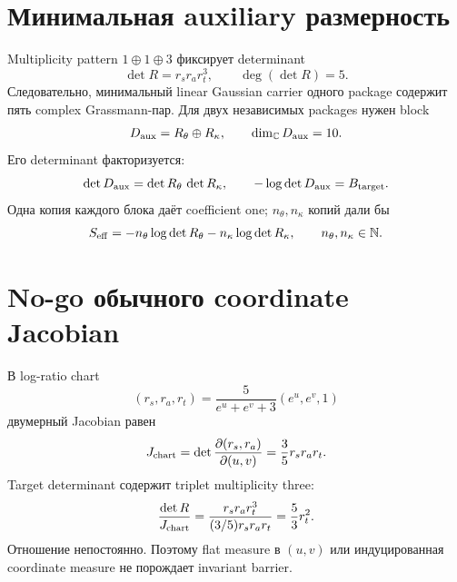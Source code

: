 \section{Минимальная auxiliary размерность}

Multiplicity pattern $1\oplus1\oplus3$ фиксирует determinant
\begin{equation}
 \det R=r_s r_a r_t^3,
 \qquad
 \deg(\det R)=5.
 \label{eq:v9-kms-logdet-measure-degree-five}
\end{equation}
Следовательно, минимальный linear Gaussian carrier одного package содержит
пять complex Grassmann-пар. Для двух независимых packages нужен block
\begin{equation}
 D_{\rm aux}=R_\theta\oplus R_\kappa,
 \qquad
 \dim_{\mathbb C}D_{\rm aux}=10.
 \label{eq:v9-kms-logdet-measure-aux-block}
\end{equation}
Его determinant факторизуется:
\begin{equation}
 \det D_{\rm aux}=\det R_\theta\,\det R_\kappa,
 \qquad
 -\log\det D_{\rm aux}=B_{\rm target}.
 \label{eq:v9-kms-logdet-measure-block-factorization}
\end{equation}
Одна копия каждого блока даёт coefficient one; $n_\theta,n_\kappa$
копий дали бы
\begin{equation}
 S_{\rm eff}=-n_\theta\log\det R_\theta
 -n_\kappa\log\det R_\kappa,
 \qquad n_\theta,n_\kappa\in\mathbb N.
 \label{eq:v9-kms-logdet-measure-copy-number}
\end{equation}

\section{No-go обычного coordinate Jacobian}

В log-ratio chart
\begin{equation}
 (r_s,r_a,r_t)=
 \frac5{e^u+e^v+3}(e^u,e^v,1)
 \label{eq:v9-kms-logdet-measure-chart}
\end{equation}
двумерный Jacobian равен
\begin{equation}
 J_{\rm chart}
 =\det\frac{\partial(r_s,r_a)}{\partial(u,v)}
 =\frac35 r_s r_a r_t.
 \label{eq:v9-kms-logdet-measure-chart-jacobian}
\end{equation}
Target determinant содержит triplet multiplicity three:
\begin{equation}
 \frac{\det R}{J_{\rm chart}}
 =\frac{r_s r_a r_t^3}{(3/5)r_s r_a r_t}
 =\frac53 r_t^2.
 \label{eq:v9-kms-logdet-measure-chart-mismatch}
\end{equation}
Отношение непостоянно. Поэтому flat measure в $(u,v)$ или индуцированная
coordinate measure не порождает invariant barrier.

